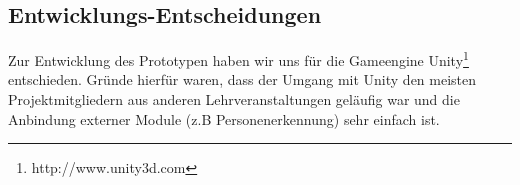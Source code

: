 \subsection{Entwicklungs-Entscheidungen}
Zur Entwicklung des Prototypen haben wir uns für die Gameengine Unity\footnote{http://www.unity3d.com} entschieden.
Gründe hierfür waren, dass der Umgang mit Unity den meisten Projektmitgliedern aus anderen Lehrveranstaltungen geläufig war und die Anbindung externer Module (z.B Personenerkennung) sehr einfach ist.